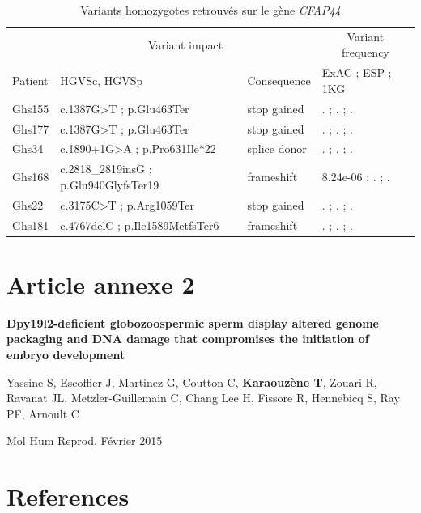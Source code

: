 \documentclass[12pt,a4paper,twoside]{ugathesis}
\theoremstyle{definition}
\theoremstyle{definition}
\theoremstyle{definition}
\theoremstyle{remark}
\begin{document}
\begin{longtable}[t]{llll}
\caption{\label{tab:tabcfap44}Variants homozygotes retrouvés sur le gène \textit{CFAP44}}\\
\toprule
\multicolumn{1}{c}{ } & \multicolumn{2}{c}{Variant impact} & \multicolumn{1}{c}{Variant frequency} \\
\cmidrule(l{2pt}r{2pt}){2-3} \cmidrule(l{2pt}r{2pt}){4-4}
Patient & HGVSc, HGVSp & Consequence & ExAC ; ESP ; 1KG\\
\midrule
Ghs155 & c.1387G>T ; p.Glu463Ter & stop gained & . ; . ; .\\
Ghs177 & c.1387G>T ; p.Glu463Ter & stop gained & . ; . ; .\\
Ghs34 & c.1890+1G>A ; p.Pro631Ile*22 & splice donor & . ; . ; .\\
Ghs168 & c.2818\_2819insG ; p.Glu940GlyfsTer19 & frameshift & 8.24e-06 ; . ; .\\
Ghs22 & c.3175C>T ; p.Arg1059Ter & stop gained & . ; . ; .\\
Ghs181 & c.4767delC ; p.Ile1589MetfsTer6 & frameshift & . ; . ; .\\
\bottomrule
\end{longtable}

\hypertarget{dpy2015}{\chapter{Article annexe 2}\label{dpy2015}}

\textbf{Dpy19l2-deficient globozoospermic sperm display altered genome
packaging and DNA damage that compromises the initiation of embryo
development}

Yassine S, Escoffier J, Martinez G, Coutton C, \textbf{Karaouzène T},
Zouari R, Ravanat JL, Metzler-Guillemain C, Chang Lee H, Fissore R,
Hennebicq S, Ray PF, Arnoult C

Mol Hum Reprod, Février 2015

\newpage



\newpage

\backmatter

\chapter*{References}\label{references}

\noindent

\setlength{\parindent}{-0.20in} \setlength{\leftskip}{0.20in}
\setlength{\parskip}{8pt}
\end{document}
